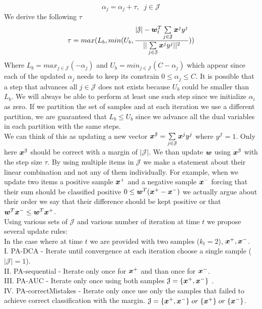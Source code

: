 \[ \alpha_j = \alpha_j + \tau , \;\; j \in \mathcal{J} \]
We derive the following $\tau$
\[ \tau = max(L_b   , min(U_b , \frac{|\mathcal{J}| - \bm{w}_t^T \sum\limits_{j \in \mathcal{J}} {\bm{x}^j y^j}   }{|| \sum\limits_{j \in \mathcal{J} }{\bm{x}^j y^j} ||^2 }  ) )
\]
Where $ L_b = max_{ j \in \mathcal{J} } (-\alpha_j) $ and $ U_b = min_{ j \in \mathcal{J} } (C -\alpha_j) $ which appear since each of the updated $\alpha_j$ needs to keep its constrain $0 \leq \alpha_j \leq C $.
It is possible that a step that advances all $j \in \mathcal{J} $ does not exists because $ U_b $ could be smaller than $L_b$. We will always be able to perform at least one such step since we initialize $\alpha_i$ as zero. If we partition the set of samples and at each iteration we use a different partition, we are guaranteed that $L_b \leq U_b $ since we advance all the dual variables in each partition with the same steps.\\



We can think of this as updating a new vector $\bm{x}^\mathcal{J} = \sum\limits_{j \in \mathcal{J} }{\bm{x}^j y^j}$ where $y^\mathcal{J} = 1 $. Only here $\bm{x}^\mathcal{J}$ should be correct with a margin of $|\mathcal{J}| $.  We than update $\bm{w}$ using $\bm{x}^\mathcal{J}$ with the step size $\tau$. By using multiple items in $\mathcal{J}$ we make a statement about their linear combination and not any of them individually. For example, when we update two items a positive sample $\bm{x}^+$ and a negative sample $\bm{x}^-$ forcing that their sum should be classified positive $0 \leq \bm{w}^T (\bm{x}^+ - \bm{x}^-) $ we actually argue about their order we say that their difference should be kept positive or that $ \bm{w}^T \bm{x}^- \leq \bm{w}^T \bm{x}^+$.\\


Using various sets of $ \mathcal{J} $ and various number of iteration at time $t$ we propose several update rules:\\

In the case where at time $t$ we are provided with two samples ($k_t=2$), $\bm{x}^+, \bm{x}^-$.\\
I. PA-DCA - Iterate until convergence at each iteration choose a single sample ($|\mathcal{J}|=1$).\\
II. PA-sequential - Iterate only once for $\bm{x}^+$ and than once for $\bm{x}^-$.\\
III. PA-AUC - Iterate only once using both samples $\mathcal{J} = \{\bm{x}^+, \bm{x}^-\} $ .\\
IV. PA-correctMistakes - Iterate only once use only the samples that failed to achieve correct classification with the margin. $\mathcal{J} = \{\bm{x}^+, \bm{x}^-\} \; or \;\{\bm{x}^+ \} \; or \; \{ \bm{x}^- \}$.\\

